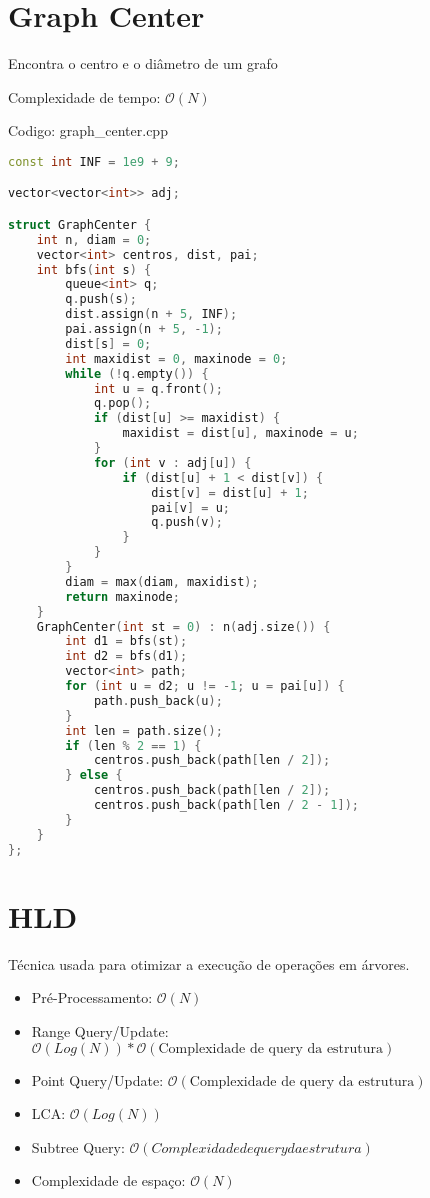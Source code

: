 \documentclass[10pt, a4paper, oneside]{book}
\begin{document}
\section{Graph Center}


Encontra o centro e o diâmetro de um grafo



Complexidade de tempo: $\mathcal{O}(N)$

\hfill

Codigo: graph\_center.cpp

\begin{lstlisting}[language=C++]
const int INF = 1e9 + 9;

vector<vector<int>> adj;

struct GraphCenter {
    int n, diam = 0;
    vector<int> centros, dist, pai;
    int bfs(int s) {
        queue<int> q;
        q.push(s);
        dist.assign(n + 5, INF);
        pai.assign(n + 5, -1);
        dist[s] = 0;
        int maxidist = 0, maxinode = 0;
        while (!q.empty()) {
            int u = q.front();
            q.pop();
            if (dist[u] >= maxidist) {
                maxidist = dist[u], maxinode = u;
            }
            for (int v : adj[u]) {
                if (dist[u] + 1 < dist[v]) {
                    dist[v] = dist[u] + 1;
                    pai[v] = u;
                    q.push(v);
                }
            }
        }
        diam = max(diam, maxidist);
        return maxinode;
    }
    GraphCenter(int st = 0) : n(adj.size()) {
        int d1 = bfs(st);
        int d2 = bfs(d1);
        vector<int> path;
        for (int u = d2; u != -1; u = pai[u]) {
            path.push_back(u);
        }
        int len = path.size();
        if (len % 2 == 1) {
            centros.push_back(path[len / 2]);
        } else {
            centros.push_back(path[len / 2]);
            centros.push_back(path[len / 2 - 1]);
        }
    }
};
\end{lstlisting}
\hfill

\section{HLD}


Técnica usada para otimizar a execução de operações em árvores.



\begin{itemize}
\item Pré-Processamento: $\mathcal{O}(N)$
\item Range Query/Update: $\mathcal{O}(Log(N)) * \mathcal{O}(\text{Complexidade de query da estrutura})$
\item Point Query/Update: $\mathcal{O}(\text{Complexidade de query da estrutura})$
\item LCA: $\mathcal{O}(Log(N))$
\item Subtree Query: $\mathcal{O}(Complexidade de query da estrutura)$
\item Complexidade de espaço: $\mathcal{O}(N)$
\end{itemize}
\end{document}
